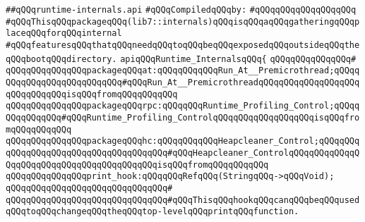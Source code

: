 \label{src/lib/std/src/nj/runtime-internals.api}
\verb|##qQQqruntime-internals.api|\newline
\newline
\verb|#qQQqCompiledqQQqby:|\newline
\verb|#qQQqqQQqqQQqqQQqqQQq|\newline
\newline
\newline
\newline
\verb|#qQQqThisqQQqpackageqQQq(lib7::internals)qQQqisqQQqaqQQqgatheringqQQqplaceqQQqforqQQqinternal|\newline
\verb|#qQQqfeaturesqQQqthatqQQqneedqQQqtoqQQqbeqQQqexposedqQQqoutsideqQQqtheqQQqbootqQQqdirectory.|\newline
\newline
\newline
\verb|apiqQQqRuntime_InternalsqQQq{|\newline
\verb|qQQqqQQqqQQqqQQq#|\newline
\verb|qQQqqQQqqQQqqQQqpackageqQQqat:qQQqqQQqqQQqRun_At__Premicrothread;qQQqqQQqqQQqqQQqqQQqqQQqqQQq#qQQqRun_At__PremicrothreadqQQqqQQqqQQqqQQqqQQqqQQqqQQqqQQqisqQQqfromqQQqqQQqqQQq|\newline
\verb|qQQqqQQqqQQqqQQqpackageqQQqrpc:qQQqqQQqRuntime_Profiling_Control;qQQqqQQqqQQqqQQq#qQQqRuntime_Profiling_ControlqQQqqQQqqQQqqQQqqQQqisqQQqfromqQQqqQQqqQQq|\newline
\verb|qQQqqQQqqQQqqQQqpackageqQQqhc:qQQqqQQqqQQqHeapcleaner_Control;qQQqqQQqqQQqqQQqqQQqqQQqqQQqqQQqqQQqqQQq#qQQqHeapcleaner_ControlqQQqqQQqqQQqqQQqqQQqqQQqqQQqqQQqqQQqqQQqqQQqisqQQqfromqQQqqQQqqQQq|\newline
\newline
\verb|qQQqqQQqqQQqqQQqprint_hook:qQQqqQQqRefqQQq(StringqQQq->qQQqVoid);|\newline
\verb|qQQqqQQqqQQqqQQqqQQqqQQqqQQqqQQq#|\newline
\verb|qQQqqQQqqQQqqQQqqQQqqQQqqQQqqQQq#qQQqThisqQQqhookqQQqcanqQQqbeqQQqusedqQQqtoqQQqchangeqQQqtheqQQqtop-levelqQQqprintqQQqfunction.|\newline
\newline
